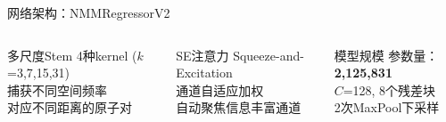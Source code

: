 \documentclass[aspectratio=169,9pt]{beamer}
\begin{document}
\begin{frame}{网络架构：NMMRegressorV2}
\begin{center}
  \end{center}

  \vspace{2pt}
  \begin{columns}[T]
    \begin{block}{多尺度Stem}
      \scriptsize
      4种kernel ($k$=3,7,15,31)\\
      捕获不同空间频率\\
      对应不同距离的原子对
    \end{block}
    \begin{block}{SE注意力}
      \scriptsize
      Squeeze-and-Excitation\\
      通道自适应加权\\
      自动聚焦信息丰富通道
    \end{block}
    \begin{block}{模型规模}
      \scriptsize
      参数量：\textbf{2,125,831}\\
      $C$=128, 8个残差块\\
      2次MaxPool下采样
    \end{block}
  \end{columns}
\end{frame}
\end{document}

